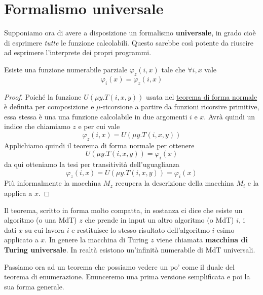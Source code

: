 \section{Formalismo universale}
Supponiamo ora di avere a disposizione un formalismo
\textbf{universale}, in grado cioè di esprimere \emph{tutte}
le funzione calcolabili. Questo sarebbe così potente da
riuscire ad esprimere l'interprete dei propri programmi.

\begin{theorem}[Enumerazione] \label{th: enum}
	Esiste una funzione numerabile parziale $\varphi_z(i, x)$
	tale che $\forall i,x$ vale
	\[ \varphi_i(x) = \varphi_z (i, x) \]
	\begin{proof}
		Poiché la funzione $U(\mu y . T(i, x, y))$ usata nel
		\hyperref[th: fn]{teorema di forma normale} è definita
		per composizione e $\mu$-ricorsione a partire da
		funzioni ricorsive primitive, essa stessa è una una
		funzione calcolabile in due argomenti $i$ e $x$. Avrà
		quindi un indice che chiamiamo $z$ e per cui vale
		\[ \varphi_z (i, x) = U(\mu y. T(i, x, y)) \]
		Applichiamo quindi il teorema di forma normale per
		ottenere
		\[ U(\mu y . T(i, x, y)) = \varphi_i (x) \]
		da qui otteniamo la tesi per transitività
		dell'uguaglianza
		\[
			\varphi_z (i, x) = U(\mu y . T(i, x, y)) =
			\varphi_i (x)
		\]
		Più informalmente la macchina $M_z$ recupera la
		descrizione della macchina $M_i$ e la applica a $x$.
	\end{proof}
\end{theorem}

Il teorema, scritto in forma molto compatta, in sostanza ci
dice che esiste un algoritmo (o una MdT) $z$ che prende in
input un altro algoritmo (o MdT) $i$, i dati $x$ su cui lavora
$i$ e restituisce lo stesso risultato dell'algoritmo $i$-esimo
applicato a $x$. In genere la macchina di Turing $z$ viene
chiamata \textbf{macchina di Turing universale}. In realtà
esistono un'infinità numerabile di MdT universali.

Passiamo ora ad un teorema che possiamo vedere un po' come il
duale del teorema di enumerazione. Enunceremo una prima versione
semplificata e poi la sua forma generale.

